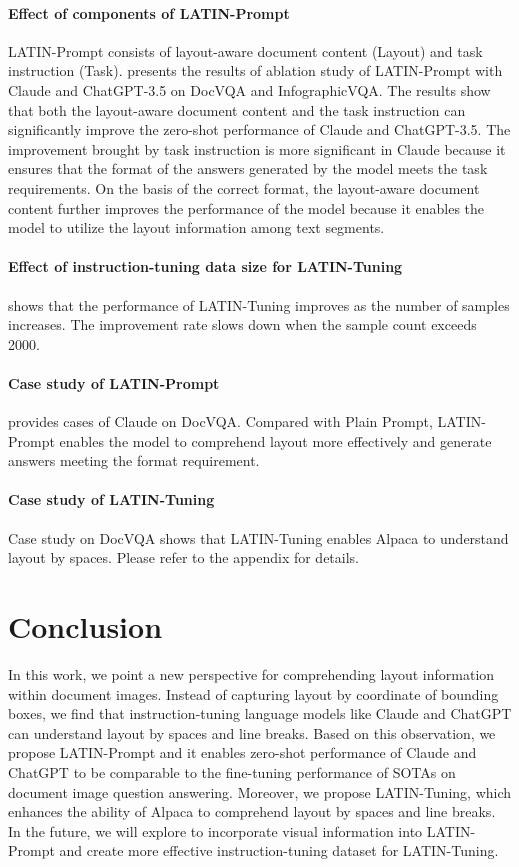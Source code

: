 \documentclass[letterpaper]{article} \usepackage{aaai24_preprint}  \usepackage{times}  \usepackage{helvet}  \usepackage{courier}  \usepackage[hyphens]{url}  \usepackage{graphicx} \urlstyle{rm} \def\UrlFont{\rm}  \usepackage{natbib}  \usepackage{caption} \frenchspacing  \setlength{\pdfpagewidth}{8.5in} \setlength{\pdfpageheight}{11in} \usepackage{algorithm}
\begin{document}
\paragraph{Effect of components of LATIN-Prompt}
LATIN-Prompt consists of layout-aware document content (Layout) and task instruction (Task).
 presents the results of ablation study of LATIN-Prompt with Claude and ChatGPT-3.5 on DocVQA and InfographicVQA.
The results show that both the layout-aware document content and the task instruction can significantly improve the zero-shot performance of Claude and ChatGPT-3.5.
The improvement brought by task instruction is more significant in Claude because it ensures that the format of the answers generated by the model meets the task requirements.
On the basis of the correct format, the layout-aware document content further improves the performance of the model because it enables the model to utilize the layout information among text segments.

\paragraph{Effect of instruction-tuning data size for LATIN-Tuning}
 shows that the performance of LATIN-Tuning improves as the number of samples increases.
The improvement rate slows down when the sample count exceeds 2000.

\paragraph{Case study of LATIN-Prompt}
 provides cases of Claude on DocVQA.
Compared with Plain Prompt, LATIN-Prompt enables the model to comprehend layout more effectively and generate answers meeting the format requirement.


\paragraph{Case study of LATIN-Tuning}
Case study on DocVQA shows that LATIN-Tuning enables Alpaca to understand layout by spaces.
Please refer to the appendix for details.





\section{Conclusion}
In this work, we point a new perspective for comprehending layout information within document images.
Instead of capturing layout by coordinate of bounding boxes, we find that instruction-tuning language models like Claude and ChatGPT can understand layout by spaces and line breaks.
Based on this observation, we propose LATIN-Prompt and it enables zero-shot performance of Claude and ChatGPT to be comparable to the fine-tuning performance of SOTAs on document image question answering.
Moreover, we propose LATIN-Tuning, which enhances the ability of Alpaca to comprehend layout by spaces and line breaks.
In the future, we will explore to incorporate visual information into LATIN-Prompt and create more effective instruction-tuning dataset for LATIN-Tuning.
\end{document}
